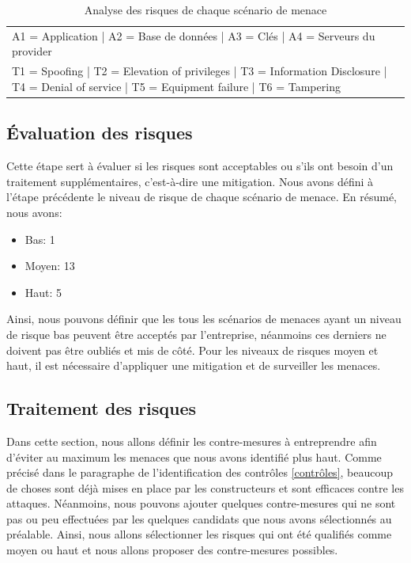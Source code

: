 \begin{table}[H]
{\begin{tabular}{cclllll}
			\multicolumn{6}{l}{A1 = Application | A2 = Base de données | A3 = Clés | A4 = Serveurs du provider}\\ 
				\multicolumn{6}{l}{T1 = Spoofing | T2 = Elevation of privileges | T3 = Information Disclosure | T4 = Denial of service | T5 = Equipment failure | T6 = Tampering}\\ 
			\hline
	\end{tabular}}
\caption{Analyse des risques de chaque scénario de menace}
\end{table}

\subsection{Évaluation des risques}

Cette étape sert à évaluer si les risques sont acceptables ou s'ils ont besoin d'un traitement supplémentaires, c'est-à-dire une mitigation. Nous avons défini à l'étape précédente le niveau de risque de chaque scénario de menace. En résumé, nous avons:

\begin{itemize}
	\item Bas: 1
	\item Moyen: 13
	\item Haut: 5
\end{itemize} 

Ainsi, nous pouvons définir que les tous les scénarios de menaces ayant un niveau de risque bas peuvent être acceptés par l'entreprise, néanmoins ces derniers ne doivent pas être oubliés et mis de côté. Pour les niveaux de risques moyen et haut, il est nécessaire d'appliquer une mitigation et de surveiller les menaces. 

\subsection{Traitement des risques}
Dans cette section, nous allons définir les contre-mesures à entreprendre afin d'éviter au maximum les menaces que nous avons identifié plus haut. Comme précisé dans le paragraphe de l'identification des contrôles \ref{contrôles}, beaucoup de choses sont déjà mises en place par les constructeurs et sont efficaces contre les attaques. Néanmoins, nous pouvons ajouter quelques contre-mesures qui ne sont pas ou peu effectuées par les quelques candidats que nous avons sélectionnés au préalable. Ainsi, nous allons sélectionner les risques qui ont été qualifiés comme moyen ou haut et nous allons proposer des contre-mesures possibles.

